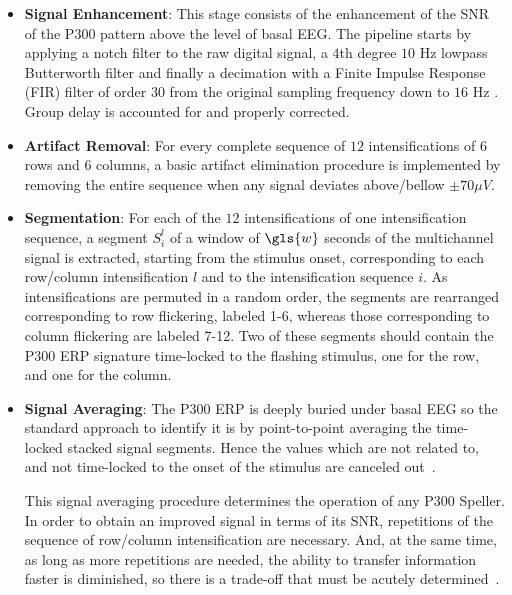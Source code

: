 
\begin{itemize}
\item \textbf{Signal Enhancement}: This stage consists of the enhancement of the SNR of the P300 pattern above the level of basal EEG. The pipeline starts by applying a notch filter to the raw digital signal, a $4$th degree $10$ Hz lowpass Butterworth filter and finally a decimation with a Finite Impulse Response (FIR) filter of order $30$ from the original sampling frequency down to $16$ Hz \cite{Krusienski2006}.  Group delay is accounted for and properly corrected.
\item \textbf{Artifact Removal}: For every complete sequence of $12$ intensifications of $6$ rows and $6$ columns, a basic artifact elimination procedure is implemented by removing the entire sequence when any signal deviates above/bellow $ \pm 70 \mu V $.
\item \textbf{Segmentation}: For each of the $12$ intensifications of one intensification sequence,  a segment $S_{i}^l$  of a window of $\gls{w}$ seconds of the multichannel signal is extracted, starting from the stimulus onset, corresponding to each row/column intensification $l$ and to the intensification sequence $i$. As intensifications are permuted in a random order, the segments are rearranged corresponding to row flickering, labeled 1-6, whereas those corresponding to column flickering are labeled 7-12.  Two of these segments should contain the P300 ERP signature time-locked to the flashing stimulus, one for the row, and one for the column.
\item \textbf{Signal Averaging}: \label{Average}  The P300 ERP is deeply buried under basal EEG so the standard approach to identify it is by point-to-point averaging the time-locked stacked signal segments.  Hence the values which are not related to, and not time-locked to the onset of the stimulus are canceled out~\cite{Liang2008}.  

\begin{story}
This signal averaging procedure determines the operation of any P300 Speller.  In order to obtain an improved signal in terms of its SNR,  repetitions of the sequence of row/column intensification are necessary.  And, at the same time, as long as more repetitions are needed, the ability to transfer information faster is diminished, so there is a trade-off that must be acutely determined~\cite{Krusienski2006}.
\end{story}


\end{itemize}
